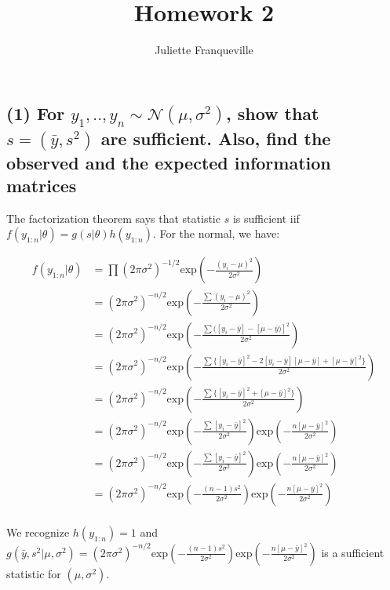 \documentclass[11pt]{article}
\begin{document}
 
\title{Homework 2}
\author{Juliette Franqueville\\
}
\maketitle

\subsection*{(1)  For $y_1,.., y_n \sim \mathcal{N}(\mu,\sigma^2 )$, show that $s = (\bar{y},s^2 )$ are sufficient. Also, find the observed and the expected information matrices}

The factorization theorem says that statistic $s$ is sufficient iif $f(y_{1:n}|\theta) = g(s|\theta)h(y_{1:n})$. For the normal, we have:

\begin{align*}
   f(y_{1:n}|\theta) &= \prod (2\pi \sigma^2)^{-1/2} \text{exp}\left(-\frac{(y_i-\mu)^2}{2\sigma^2}\right) \\
   &=(2\pi \sigma^2)^{-n/2}\text{exp}\left(-\frac{\sum (y_i-\mu)^2}{2\sigma^2}\right) \\
    &=(2\pi \sigma^2)^{-n/2}\text{exp}\left(-\frac{\sum ([y_i-\bar{y}]-[\mu-\bar{y})]^2}{2\sigma^2}\right) \\
    &=(2\pi \sigma^2)^{-n/2}\text{exp}\left(-\frac{\sum \{ [y_i-\bar{y}]^2-2[y_i-\bar{y}][\mu-\bar{y}]+[\mu-\bar{y}]^2 \}}{2\sigma^2}\right) \\
        &=(2\pi \sigma^2)^{-n/2}\text{exp}\left(-\frac{\sum \{ [y_i-\bar{y}]^2+[\mu-\bar{y}]^2 \}}{2\sigma^2}\right) \\
        &=(2\pi \sigma^2)^{-n/2}\text{exp}\left(-\frac{\sum  [y_i-\bar{y}]^2}{2\sigma^2}\right) \text{exp}\left(-\frac{n [\mu-\bar{y}]^2}{2\sigma^2}\right) \\
        &=(2\pi \sigma^2)^{-n/2}\text{exp}\left(-\frac{\sum  [y_i-\bar{y}]^2}{2\sigma^2}\right) \text{exp}\left(-\frac{n [\mu-\bar{y}]^2}{2\sigma^2}\right) \\
    &=(2\pi \sigma^2)^{-n/2}\text{exp}\left(-\frac{(n-1)s^2}{2\sigma^2}\right) \text{exp}\left(-\frac{n [\mu-\bar{y}]^2}{2\sigma^2}\right) \\
\end{align*}


We recognize $h(y_{1:n}) =1 $ and $g(\bar{y}, s^2|\mu, \sigma^2)= (2\pi \sigma^2)^{-n/2}\text{exp}\left(-\frac{(n-1)s^2}{2\sigma^2}\right) \text{exp}\left(-\frac{n [\mu-\bar{y}]^2}{2\sigma^2}\right)$ is a sufficient statistic for $(\mu, \sigma^2)$.
\end{document}
